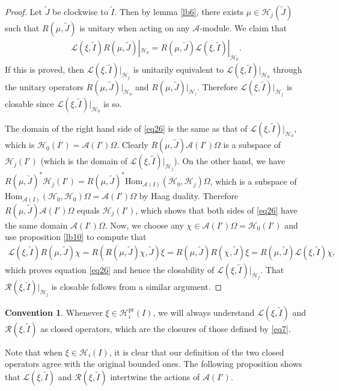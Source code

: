 \documentclass[11pt,b5paper,notitlepage]{article}
\theoremstyle{definition}
\newtheorem{cv}[df]{Convention}
\theoremstyle{plain}
\newcommand{\mc}{\mathcal}
\newcommand{\wtd}{\widetilde}
\newcommand{\Hom}{\mathrm{Hom}}
\newcommand{\scr}{\mathscr}
\newcommand{\pr}{\mathrm{pr}}
\numberwithin{equation}{subsection}
\begin{document}
\begin{proof}
Let $\wtd J$ be clockwise to $\wtd I$. Then by lemma \ref{lb6}, there exists $\mu\in\mc H_j(\wtd J)$ such that $R(\mu,\wtd J)$ is unitary when acting on any $\mc A$-module. We claim that
\begin{align}
\scr L(\xi,\wtd I)R(\mu,\wtd J)|_{\mc H_0}= R(\mu,\wtd J)\scr L(\xi,\wtd I)|_{\mc H_0}.\label{eq26}
\end{align}
If this is proved, then $\scr L(\xi,\wtd I)|_{\mc H_j}$ is unitarily equivalent to $\scr L(\xi,\wtd I)|_{\mc H_0}$ through the unitary operators $R(\mu,\wtd J)|_{\mc H_0}$ and $R(\mu,\wtd J)|_{\mc H_i}$. Therefore $\scr L(\xi,\wtd I)|_{\mc H_j}$ is closable since $\scr L(\xi,\wtd I)|_{\mc H_0}$ is so.

The domain of the right hand side of \eqref{eq26} is the same as that of $\scr L(\xi,\wtd I)|_{\mc H_0}$, which is $\mc H_0(I')=\mc A(I')\Omega$. Clearly $R(\mu,\wtd J)\mc A(I')\Omega$ is a subspace of $\mc H_j(I')$ (which is the domain of $\scr L(\xi,\wtd I)|_{\mc H_j}$). On the other hand, we have $R(\mu,\wtd J)^*\mc H_j(I')=R(\mu,\wtd J)^*\Hom_{\mc A(I)}(\mc H_0,\mc H_j)\Omega$, which is a subspace of $\Hom_{\mc A(I)}(\mc H_0,\mc H_0)\Omega=\mc A(I')\Omega$ by Haag duality. Therefore $R(\mu,\wtd J)\mc A(I')\Omega$ equals $\mc H_j(I')$, which shows that both sides of \eqref{eq26} have the same domain $\mc A(I')\Omega$. Now, we choose any $\chi\in\mc A(I')\Omega=\mc H_0(I')$ and use proposition \ref{lb10} to compute that
\begin{align*}
\scr L(\xi,\wtd I)R(\mu,\wtd J)\chi=R(R(\mu,\wtd J)\chi,\wtd J)\xi=R(\mu,\wtd J)R(\chi,\wtd J)\xi=R(\mu,\wtd J)\scr L(\xi,\wtd I)\chi,
\end{align*}
which proves equation \eqref{eq26} and hence the closability of $\scr L(\xi,\wtd I)|_{\mc H_j}$. That $\scr R(\xi,\wtd I)|_{\mc H_j}$ is closable follows from a similar argument.
\end{proof}

\begin{cv}
Whenever $\xi\in\mc H_i^\pr(I)$, we will always understand $\scr L(\xi,\wtd I)$ and $\scr R(\xi,\wtd I)$ as closed operators, which are the closures of those defined by \eqref{eq7}.
\end{cv}

Note that when $\xi\in\mc H_i(I)$, it is clear  that our definition of the two closed operators agree with the original bounded ones. The following proposition shows that $\scr L(\xi,\wtd I)$ and $\scr R(\xi,\wtd I)$ intertwine the actions of $\mc A(I')$.
\end{document}
